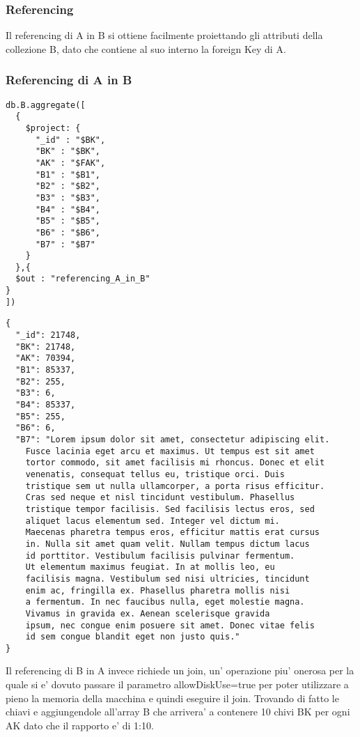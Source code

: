 \subsubsection{Referencing}

Il referencing di A in B si ottiene facilmente proiettando gli attributi della collezione B, dato che contiene al suo interno la foreign Key di A.

\subsubsection{Referencing di A in B}

\begin{verbatim}
db.B.aggregate([
  {
    $project: {
      "_id" : "$BK",
      "BK" : "$BK",
      "AK" : "$FAK",
      "B1" : "$B1",   
      "B2" : "$B2",
      "B3" : "$B3",
      "B4" : "$B4",
      "B5" : "$B5",
      "B6" : "$B6",
      "B7" : "$B7"
    }
  },{
  $out : "referencing_A_in_B"
}
])
\end{verbatim}

\begin{Verbatim}[frame=single,framesep=2mm,label= Referencing di A in B,labelposition=all]
{
  "_id": 21748,
  "BK": 21748,
  "AK": 70394,
  "B1": 85337,
  "B2": 255,
  "B3": 6,
  "B4": 85337,
  "B5": 255,
  "B6": 6,
  "B7": "Lorem ipsum dolor sit amet, consectetur adipiscing elit. 
    Fusce lacinia eget arcu et maximus. Ut tempus est sit amet 
    tortor commodo, sit amet facilisis mi rhoncus. Donec et elit
    venenatis, consequat tellus eu, tristique orci. Duis 
    tristique sem ut nulla ullamcorper, a porta risus efficitur.
    Cras sed neque et nisl tincidunt vestibulum. Phasellus 
    tristique tempor facilisis. Sed facilisis lectus eros, sed 
    aliquet lacus elementum sed. Integer vel dictum mi. 
    Maecenas pharetra tempus eros, efficitur mattis erat cursus
    in. Nulla sit amet quam velit. Nullam tempus dictum lacus
    id porttitor. Vestibulum facilisis pulvinar fermentum.
    Ut elementum maximus feugiat. In at mollis leo, eu 
    facilisis magna. Vestibulum sed nisi ultricies, tincidunt
    enim ac, fringilla ex. Phasellus pharetra mollis nisi
    a fermentum. In nec faucibus nulla, eget molestie magna.
    Vivamus in gravida ex. Aenean scelerisque gravida 
    ipsum, nec congue enim posuere sit amet. Donec vitae felis
    id sem congue blandit eget non justo quis."
}
\end{Verbatim}

Il referencing di B in A invece richiede un join, un' operazione piu' onerosa per la quale si e' dovuto passare il parametro allowDiskUse=true per poter utilizzare
a pieno la memoria della macchina e quindi eseguire il join. Trovando di fatto le chiavi e aggiungendole all'array B che arrivera' a contenere 10 chivi BK per ogni 
AK dato che il rapporto e' di 1:10. 

